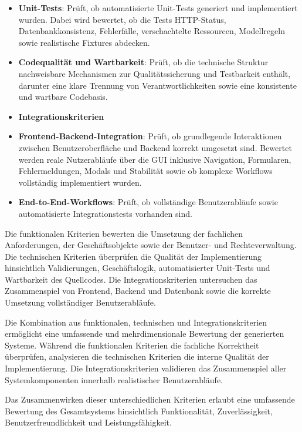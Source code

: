 \begin{itemize}
    \item \textbf{Unit-Tests}: Prüft, ob automatisierte Unit-Tests generiert und 
    implementiert wurden. Dabei wird bewertet, ob die Tests HTTP-Status, 
    Datenbankkonsistenz, Fehlerfälle, verschachtelte Ressourcen, 
    Modellregeln sowie realistische Fixtures abdecken.

    \item \textbf{Codequalität und Wartbarkeit}: Prüft, ob die technische Struktur 
    nachweisbare Mechanismen zur Qualitätssicherung und Testbarkeit enthält, 
    darunter eine klare Trennung von Verantwortlichkeiten sowie eine 
    konsistente und wartbare Codebasis.

    \item[] \textbf{Integrationskriterien}

    \item \textbf{Frontend-Backend-Integration}: Prüft, ob grundlegende Interaktionen 
    zwischen Benutzeroberfläche und Backend korrekt umgesetzt sind. Bewertet 
    werden reale Nutzerabläufe über die GUI inklusive Navigation, Formularen, 
    Fehlermeldungen, Modals und Stabilität sowie ob komplexe Workflows 
    vollständig implementiert wurden.

    \item \textbf{End-to-End-Workflows}: Prüft, ob vollständige Benutzerabläufe sowie 
    automatisierte Integrationstests vorhanden sind.

\end{itemize}
Die funktionalen Kriterien bewerten die Umsetzung der fachlichen Anforderungen, der Geschäftsobjekte sowie der Benutzer- und Rechteverwaltung. Die technischen Kriterien überprüfen die Qualität der Implementierung hinsichtlich Validierungen, Geschäftslogik, automatisierter Unit-Tests und Wartbarkeit des Quellcodes. Die Integrationskriterien untersuchen das Zusammenspiel von Frontend, Backend und Datenbank sowie die korrekte Umsetzung vollständiger Benutzerabläufe.

Die Kombination aus funktionalen, technischen und Integrationskriterien ermöglicht eine umfassende und mehrdimensionale Bewertung der generierten Systeme. Während die funktionalen Kriterien die fachliche Korrektheit überprüfen, analysieren die technischen Kriterien die interne Qualität der Implementierung. Die Integrationskriterien validieren das Zusammenspiel aller Systemkomponenten innerhalb realistischer Benutzerabläufe.

Das Zusammenwirken dieser unterschiedlichen Kriterien erlaubt eine umfassende Bewertung des Gesamtsystems hinsichtlich Funktionalität, Zuverlässigkeit, Benutzerfreundlichkeit und Leistungsfähigkeit.


